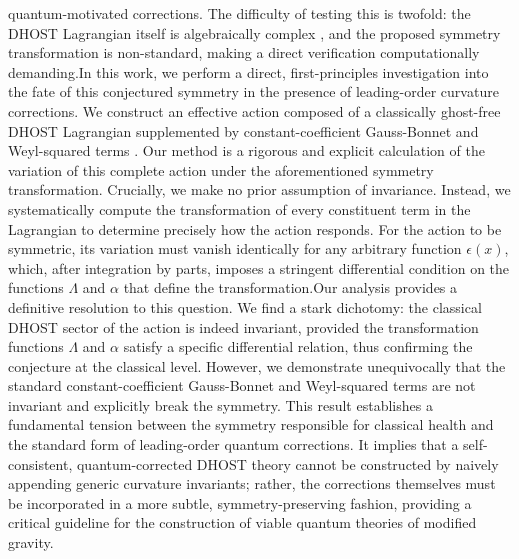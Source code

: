 \documentclass[twocolumn]{aastex631}
\begin{document}
quantum-motivated corrections. The difficulty of testing this is twofold: the DHOST Lagrangian itself is algebraically complex \citep{langlois2018degeneratehigherorderscalartensordhost}, and the proposed symmetry transformation is non-standard, making a direct verification computationally demanding.In this work, we perform a direct, first-principles investigation into the fate of this conjectured symmetry in the presence of leading-order curvature corrections. We construct an effective action composed of a classically ghost-free DHOST Lagrangian \citep{babichev2023rotatingblackholesembedded,brax2025primordialgravitationalwavesdhost} supplemented by constant-coefficient Gauss-Bonnet and Weyl-squared terms \citep{cisterna2025thermodynamicsfourdimensionalregularblack}. Our method is a rigorous and explicit calculation of the variation of this complete action under the aforementioned symmetry transformation. Crucially, we make no prior assumption of invariance. Instead, we systematically compute the transformation of every constituent term in the Lagrangian to determine precisely how the action responds. For the action to be symmetric, its variation must vanish identically for any arbitrary function $\epsilon(x)$, which, after integration by parts, imposes a stringent differential condition on the functions $\Lambda$ and $\alpha$ that define the transformation.Our analysis provides a definitive resolution to this question. We find a stark dichotomy: the classical DHOST sector of the action is indeed invariant, provided the transformation functions $\Lambda$ and $\alpha$ satisfy a specific differential relation, thus confirming the conjecture at the classical level. However, we demonstrate unequivocally that the standard constant-coefficient Gauss-Bonnet and Weyl-squared terms are not invariant and explicitly break the symmetry. This result establishes a fundamental tension between the symmetry responsible for classical health and the standard form of leading-order quantum corrections. It implies that a self-consistent, quantum-corrected DHOST theory cannot be constructed by naively appending generic curvature invariants; rather, the corrections themselves must be incorporated in a more subtle, symmetry-preserving fashion, providing a critical guideline for the construction of viable quantum theories of modified gravity.
\end{document}
